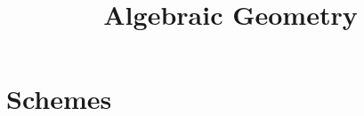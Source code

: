 \documentclass[11pt]{article}
\title{Algebraic Geometry}
\begin{document}
\maketitle

\section{Schemes}
\end{document}
